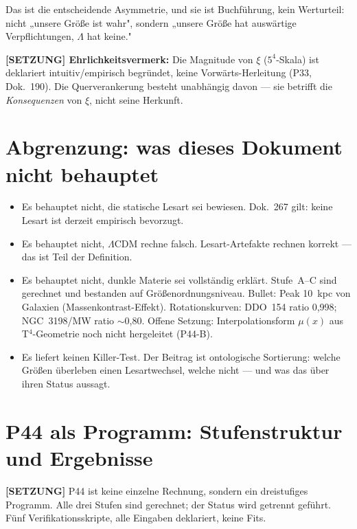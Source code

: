 \documentclass[11pt]{report}
\begin{document}
Das ist die entscheidende Asymmetrie, und sie ist Buchführung, kein
Werturteil: nicht „unsere Größe ist wahr", sondern „unsere Größe hat
auswärtige Verpflichtungen, $\Lambda$ hat keine."

\medskip
\noindent\textbf{[SETZUNG] Ehrlichkeitsvermerk:} Die Magnitude von $\xi$ ($5^4$-Skala)
ist deklariert intuitiv/empirisch begründet, keine Vorwärts-Herleitung
(P33, Dok.~190). Die Querverankerung besteht unabhängig davon — sie betrifft die
\emph{Konsequenzen} von $\xi$, nicht seine Herkunft.

\chapter{Abgrenzung: was dieses Dokument nicht behauptet}

\begin{itemize}
  \item Es behauptet nicht, die statische Lesart sei bewiesen. Dok.~267
        gilt: keine Lesart ist derzeit empirisch bevorzugt.
  \item Es behauptet nicht, $\Lambda$CDM rechne falsch. Lesart-Artefakte
        rechnen korrekt — das ist Teil der Definition.
  \item Es behauptet nicht, dunkle Materie sei vollständig erklärt.
        Stufe~A–C sind gerechnet und bestanden auf Größenordnungsniveau.
        Bullet: Peak 10~kpc von Galaxien (Massenkontrast-Effekt).
        Rotationskurven: DDO~154 ratio 0{,}998; NGC~3198/MW ratio $\sim$0{,}80.
        Offene Setzung: Interpolationsform $\mu(x)$ aus T$^4$-Geometrie
        noch nicht hergeleitet (P44-B).
  \item Es liefert keinen Killer-Test. Der Beitrag ist ontologische
        Sortierung: welche Größen überleben einen Lesartwechsel, welche
        nicht — und was das über ihren Status aussagt.
\end{itemize}

\chapter{P44 als Programm: Stufenstruktur und Ergebnisse}

\textbf{[SETZUNG]} P44 ist keine einzelne Rechnung, sondern ein dreistufiges
Programm. Alle drei Stufen sind gerechnet; der Status wird getrennt
geführt. Fünf Verifikationsskripte, alle Eingaben deklariert, keine Fits.
\end{document}
